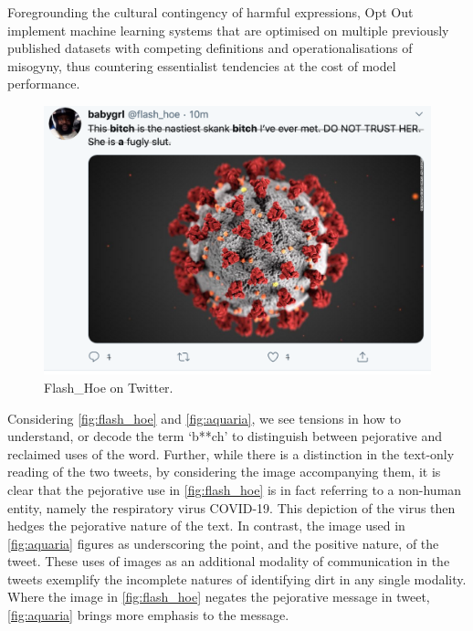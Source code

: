 Foregrounding the cultural contingency of harmful expressions, Opt Out implement machine learning systems that are optimised on multiple previously published datasets with competing definitions and operationalisations of misogyny, thus countering essentialist tendencies at the cost of model performance.

\begin{figure}[!ht]
  \centering
  \includegraphics[scale=0.5]{Rona.png}
  \caption{Flash\_Hoe on Twitter.}
  \label{fig:flash_hoe}
\end{figure}

Considering \autoref{fig:flash_hoe} and \autoref{fig:aquaria}, we see tensions in how to understand, or decode the term `b**ch' to distinguish between pejorative and reclaimed uses of the word. 
Further, while there is a distinction in the text-only reading of the two tweets, by considering the image accompanying them, it is clear that the pejorative use in \autoref{fig:flash_hoe} is in fact referring to a non-human entity, namely the respiratory virus COVID-19. 
This depiction of the virus then hedges the pejorative nature of the text. 
In contrast, the image used in \autoref{fig:aquaria} figures as underscoring the point, and the positive nature, of the tweet.
These uses of images as an additional modality of communication in the tweets exemplify the incomplete natures of identifying dirt in any single modality.
Where the image in \autoref{fig:flash_hoe} negates the pejorative message in tweet, \autoref{fig:aquaria} brings more emphasis to the message.

